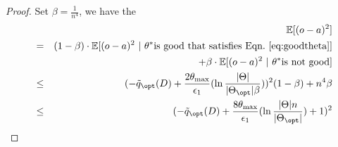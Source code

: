 \begin{proof}
Set $\beta=\frac{1}{n^4}$, we have the 
\begin{eqnarray}
    && \mathbb{E}[(o-a)^2] \nonumber  \\
   &=& (1-\beta) \cdot \mathbb{E}[(o-a)^2 ~|~\theta^* \text{is good that satisfies Eqn.~\eqref{eq:goodtheta}}] \nonumber \\ 
   && + \beta \cdot \mathbb{E}[(o-a)^2 ~|~\theta^* \text{is not good}]  \nonumber \\
      &\leq& (-\tilde{q}_{\opt}(D) + \frac{2 \theta_{\max}}{\epsilon_1} (\ln \frac{|\Theta|}{|\Theta_{\opt}|\beta}))^2 (1-\beta) + n^4 \beta     
      \nonumber \\
    &\leq&  (-\tilde{q}_{\opt}(D) + \frac{8 \theta_{\max}}{\epsilon_1} (\ln \frac{|\Theta|n}{|\Theta_{\opt}|})+1)^2  
\end{eqnarray}
\end{proof}
